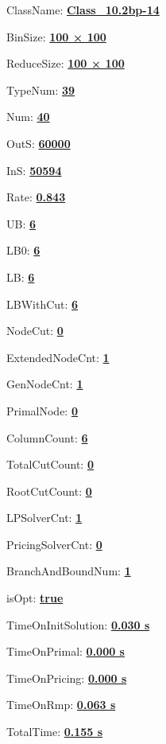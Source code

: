 \documentclass[11pt]{article}
\begin{document}
\pagestyle{empty}


ClassName: \underline{\textbf{Class_10.2bp-14}}
\par
BinSize: \underline{\textbf{100 × 100}}
\par
ReduceSize: \underline{\textbf{100 × 100}}
\par
TypeNum: \underline{\textbf{39}}
\par
Num: \underline{\textbf{40}}
\par
OutS: \underline{\textbf{60000}}
\par
InS: \underline{\textbf{50594}}
\par
Rate: \underline{\textbf{0.843}}
\par
UB: \underline{\textbf{6}}
\par
LB0: \underline{\textbf{6}}
\par
LB: \underline{\textbf{6}}
\par
LBWithCut: \underline{\textbf{6}}
\par
NodeCut: \underline{\textbf{0}}
\par
ExtendedNodeCnt: \underline{\textbf{1}}
\par
GenNodeCnt: \underline{\textbf{1}}
\par
PrimalNode: \underline{\textbf{0}}
\par
ColumnCount: \underline{\textbf{6}}
\par
TotalCutCount: \underline{\textbf{0}}
\par
RootCutCount: \underline{\textbf{0}}
\par
LPSolverCnt: \underline{\textbf{1}}
\par
PricingSolverCnt: \underline{\textbf{0}}
\par
BranchAndBoundNum: \underline{\textbf{1}}
\par
isOpt: \underline{\textbf{true}}
\par
TimeOnInitSolution: \underline{\textbf{0.030 s}}
\par
TimeOnPrimal: \underline{\textbf{0.000 s}}
\par
TimeOnPricing: \underline{\textbf{0.000 s}}
\par
TimeOnRmp: \underline{\textbf{0.063 s}}
\par
TotalTime: \underline{\textbf{0.155 s}}
\par
\newpage


\end{document}
